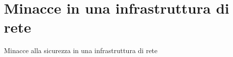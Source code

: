 \chapter{Minacce in una infrastruttura di rete}	 %

Minacce alla sicurezza in una infrastruttura di rete 